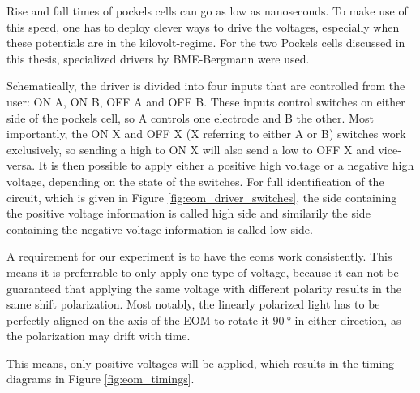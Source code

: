 Rise and fall times of pockels cells can go as low as nanoseconds. To make use of this speed, one has to deploy clever ways to drive the voltages, especially when these potentials are in the kilovolt-regime. For the two Pockels cells discussed in this thesis, specialized drivers by BME-Bergmann were used.

Schematically, the driver is divided into four inputs that are controlled from the user: ON A, ON B, OFF A and OFF B. These inputs control switches on either side of the pockels cell, so A controls one electrode and B the other. Most importantly, the ON X and OFF X (X referring to either A or B) switches work exclusively, so sending a high to ON X will also send a low to OFF X and vice-versa. It is then possible to apply either a positive high voltage or a negative high voltage, depending on the state of the switches. For full identification of the circuit, which is given in Figure \ref{fig:eom_driver_switches}, the side containing the positive voltage information is called high side and similarily the side containing the negative voltage information is called low side.

A requirement for our experiment is to have the \acp{eom} work consistently. This means it is preferrable to only apply one type of voltage, because it can not be guaranteed that applying the same voltage with different polarity results in the same shift polarization. Most notably, the linearly polarized light has to be perfectly aligned on the axis of the EOM to rotate it $\SI{90}{\degree}$ in either direction, as the polarization may drift with time.

This means, only positive voltages will be applied, which results in the timing diagrams in Figure \ref{fig:eom_timings}.

\begin{figure}[t]
\end{figure}

\begin{figure}[t]
\end{figure}

